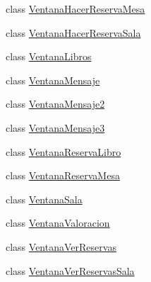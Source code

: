 \begin{DoxyCompactItemize}
class \mbox{\hyperlink{classes_1_1deusto_1_1spq_1_1biblioteca_1_1client_1_1gui_1_1_ventana_hacer_reserva_mesa}{Ventana\+Hacer\+Reserva\+Mesa}}
\item 
class \mbox{\hyperlink{classes_1_1deusto_1_1spq_1_1biblioteca_1_1client_1_1gui_1_1_ventana_hacer_reserva_sala}{Ventana\+Hacer\+Reserva\+Sala}}
\item 
class \mbox{\hyperlink{classes_1_1deusto_1_1spq_1_1biblioteca_1_1client_1_1gui_1_1_ventana_libros}{Ventana\+Libros}}
\item 
class \mbox{\hyperlink{classes_1_1deusto_1_1spq_1_1biblioteca_1_1client_1_1gui_1_1_ventana_mensaje}{Ventana\+Mensaje}}
\item 
class \mbox{\hyperlink{classes_1_1deusto_1_1spq_1_1biblioteca_1_1client_1_1gui_1_1_ventana_mensaje2}{Ventana\+Mensaje2}}
\item 
class \mbox{\hyperlink{classes_1_1deusto_1_1spq_1_1biblioteca_1_1client_1_1gui_1_1_ventana_mensaje3}{Ventana\+Mensaje3}}
\item 
class \mbox{\hyperlink{classes_1_1deusto_1_1spq_1_1biblioteca_1_1client_1_1gui_1_1_ventana_reserva_libro}{Ventana\+Reserva\+Libro}}
\item 
class \mbox{\hyperlink{classes_1_1deusto_1_1spq_1_1biblioteca_1_1client_1_1gui_1_1_ventana_reserva_mesa}{Ventana\+Reserva\+Mesa}}
\item 
class \mbox{\hyperlink{classes_1_1deusto_1_1spq_1_1biblioteca_1_1client_1_1gui_1_1_ventana_sala}{Ventana\+Sala}}
\item 
class \mbox{\hyperlink{classes_1_1deusto_1_1spq_1_1biblioteca_1_1client_1_1gui_1_1_ventana_valoracion}{Ventana\+Valoracion}}
\item 
class \mbox{\hyperlink{classes_1_1deusto_1_1spq_1_1biblioteca_1_1client_1_1gui_1_1_ventana_ver_reservas}{Ventana\+Ver\+Reservas}}
\item 
class \mbox{\hyperlink{classes_1_1deusto_1_1spq_1_1biblioteca_1_1client_1_1gui_1_1_ventana_ver_reservas_sala}{Ventana\+Ver\+Reservas\+Sala}}
\end{DoxyCompactItemize}
